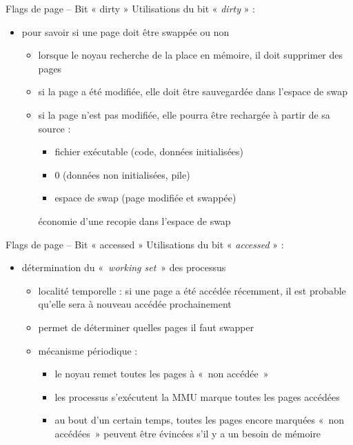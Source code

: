 \begin {frame} {Flags de page -- Bit « dirty »}
    Utilisations du bit « \textit {dirty} » : 
    \begin {itemize}
	\item pour savoir si une page doit être swappée ou non
	    \begin {itemize}
		\item lorsque le noyau recherche de la place en mémoire,
		    il doit supprimer des pages
		\item si la page a été modifiée, elle doit être
		    sauvegardée dans l'espace de swap
		\item si la page n'est pas modifiée, elle pourra être
		    rechargée à partir de sa source :
		    \begin {itemize}
			\item fichier exécutable (code, données initialisées)
			\item 0 (données non initialisées, pile)
			\item espace de swap (page modifiée et swappée)
		    \end {itemize}
		    \implique économie d'une recopie dans l'espace de swap
	    \end {itemize}
    \end {itemize}
\end {frame}

\begin {frame} {Flags de page -- Bit « accessed »}
    Utilisations du bit « \textit {accessed} » : 
    \begin {itemize}
	\item détermination du «~\textit {working set}~» des processus
	    \begin {itemize}
		\item localité temporelle : si une page a été accédée
		    récemment, il est probable qu'elle sera à nouveau
		    accédée prochainement
		\item permet de déterminer quelles pages il faut swapper
		\item mécanisme périodique :
		    \begin {itemize}
			\item le noyau remet toutes les pages à «~non
			    accédée~»
			\item les processus s'exécutent \implique la
			    MMU marque toutes les pages accédées
			\item au bout d'un certain temps, toutes les pages
			    encore marquées «~non accédées~» peuvent être
			    évincées s'il y a un besoin de mémoire
		    \end {itemize}
	    \end {itemize}
    \end {itemize}
\end {frame}


